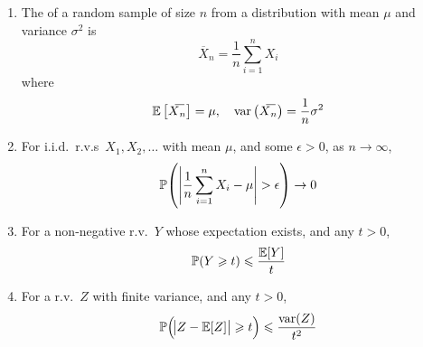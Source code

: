 \documentclass{styles/note}
\begin{document}
  \begin{enumerate}[label=(\alph*)]
    \item The  of a random sample of size $n$ from a distribution with mean $\mu$ and variance $\sigma^2$ is
      \begin{equation}
        \overline{X}_n = \frac{1}{n} \sum_{i=1}^n X_i
      \end{equation}
      where
      \begin{equation}
        \expectation\big[\overline{X}_n\big] = \mu, \quad \variance\big(\overline{X}_n\big) = \frac{1}{n} \sigma^2
      \end{equation}
    
    \item {}
      For i.i.d.~r.v.s~$X_1, X_2, \dots$ with mean $\mu$, and some $\epsilon > 0$, as $n \to \infty$,
      \begin{equation}
        \prob\left(\Bigg|\frac{1}{n} \sum_{i=1}^n X_i - \mu\Bigg| > \epsilon\right) \to 0
      \end{equation}
    
    \item {}
      For a non-negative r.v.~$Y$ whose expectation exists, and any $t > 0$,
      \begin{equation}
        \operatorname{\mathbb{P}}(Y \geqslant t) \leqslant \frac{\operatorname{\mathbb{E}}[Y]}{t}
      \end{equation}
    
    \item {}
      For a r.v.~$Z$ with finite variance, and any $t > 0$,
      \begin{equation}
        \prob\left(\abs{Z - \expectation[Z]} \geqslant t\right) \leqslant \frac{\variance(Z)}{t^2}
      \end{equation}
  \end{enumerate}
\end{document}
